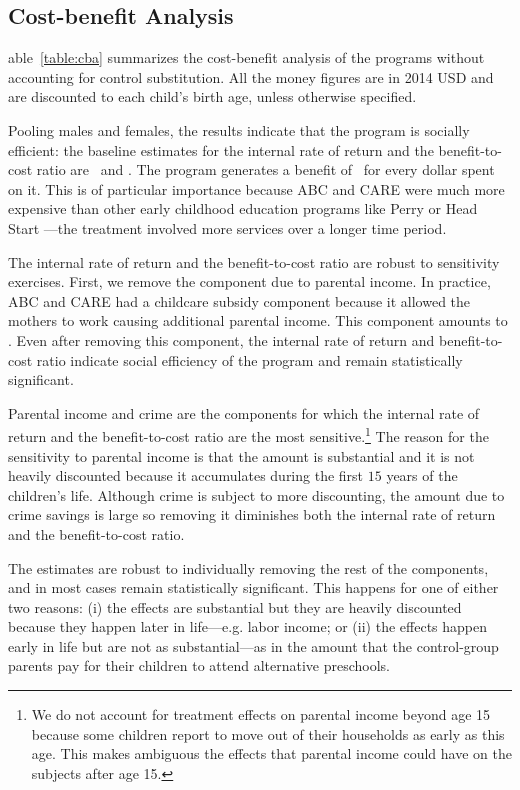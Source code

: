 \subsection{Cost-benefit Analysis} \label{section:cbaresults}

 able~\ref{table:cba} summarizes the cost-benefit analysis of the programs without accounting for control substitution. All the money figures are in 2014 USD and are discounted to each child's birth age, unless otherwise specified.

Pooling males and females, the results indicate that the program is socially efficient: the baseline estimates for the internal rate of return and the benefit-to-cost ratio are \irrp\ and \bcp. The program generates a benefit of \bcp\ for every dollar spent on it. This is of particular importance because ABC and CARE were much more expensive than other early childhood education programs like Perry or Head Start \citep{Elango_Hojman_etal_2016_Early-Edu}---the treatment involved more services over a longer time period.

The internal rate of return and the benefit-to-cost ratio are robust to sensitivity exercises. First, we remove the component due to parental income. In practice, ABC and CARE had a childcare subsidy component because it allowed the mothers to work causing additional parental income. This component amounts to \parincomenpvp. Even after removing this component, the internal rate of return and benefit-to-cost ratio indicate social efficiency of the program and remain statistically significant.

Parental income and crime are the components for which the internal rate of return and the benefit-to-cost ratio are the most sensitive.\footnote{We do not account for treatment effects on parental income beyond age 15 because some children report to move out of their households as early as this age. This makes ambiguous the effects that parental income could have on the subjects after age 15.} The reason for the sensitivity to parental income is that the amount is substantial and it is not heavily discounted because it accumulates during the first $15$ years of the children's life. Although crime is subject to more discounting, the amount due to crime savings is large so removing it diminishes both the internal rate of return and the benefit-to-cost ratio.

The estimates are robust to individually removing the rest of the components, and in most cases remain statistically significant. This happens for one of either two reasons: (i) the effects are substantial but they are heavily discounted because they happen later in life---e.g. labor income; or (ii) the effects happen early in life but are not as substantial---as in the amount that the control-group parents pay for their children to attend alternative preschools.

